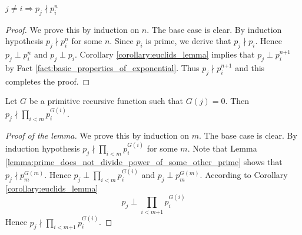 \documentclass[10pt]{amsart}
\newcommand{\mra}{\boldsymbol{\Rightarrow}}
\newcommand{\mle}{\boldsymbol{<}}
\newcommand{\meq}{\boldsymbol{=}}
\newcommand{\mneq}{\boldsymbol{\neq}}
\newcommand{\mplus}{\boldsymbol{+}}
\begin{document}
\begin{lemma}\label{lemma:prime_does_not_divide_power_of_some_other_prime}
	$j\mneq i \mra p_j\nmid p_i^n$
\end{lemma}
\begin{proof}
	We prove this by induction on $n$. The base case is clear. By induction hypothesis $p_j \nmid p_i^n$ for some $n$. Since $p_i$ is prime, we derive that $p_j \nmid p_i$. Hence $p_j \perp p_i^n$ and $p_j \perp p_i$. Corollary \ref{corollary:euclids_lemma} implies that $p_j \perp p_i^{n\mplus1}$ by Fact \ref{fact:basic_properties_of_exponential}. Thus $p_j \nmid p_i^{n\mplus1}$ and this completes the proof.
\end{proof}

\begin{lemma}\label{lemma:zero_exponent_implies_that_prime_does_not_divide}
	Let $G$ be a primitive recursive function such that $G(j) \meq 0$. Then $p_j \nmid \prod_{i \mle m}p_i^{G(i)}$.
\end{lemma}
\begin{proof}[Proof of the lemma]
	We prove this by induction on $m$. The base case is clear. By induction hypothesis $p_j \nmid \prod_{i \mle m}p_i^{G(i)}$ for some $m$. Note that Lemma \ref{lemma:prime_does_not_divide_power_of_some_other_prime} shows that $p_j \nmid p_m^{G(m)}$. Hence $p_j \perp \prod_{i \mle m}p_i^{G(i)}$ and $p_j \perp p_m^{G(m)}$. According to Corollary \ref{corollary:euclids_lemma}
	$$p_j \perp \prod_{i \mle m \mplus 1}p_i^{G(i)}$$
	Hence $p_j \nmid \prod_{i \mle m \mplus 1}p_i^{G(i)}$.
\end{proof}
\end{document}
